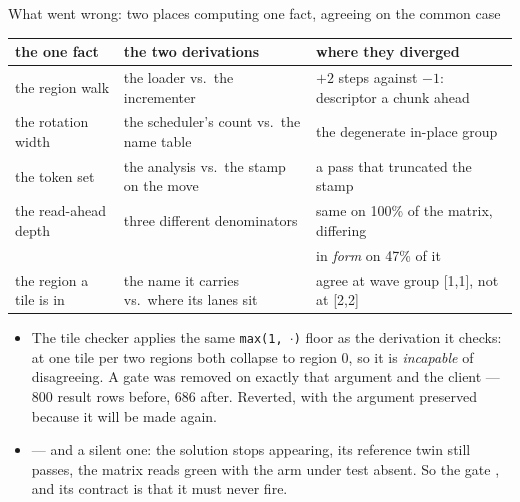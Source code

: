\begin{frame}{What went wrong: two places computing one fact, agreeing on the common case}
\begin{center}
{\scriptsize\setlength{\tabcolsep}{4pt}
\begin{tabular}{lll}
\toprule
\textbf{the one fact} & \textbf{the two derivations} & \textbf{where they diverged} \\
\midrule
the region walk & the loader vs.\ the incrementer & $+2$ steps against $-1$: descriptor a chunk ahead \\
the rotation width & the scheduler's count vs.\ the name table & the degenerate in-place group \\
the token set & the analysis vs.\ the stamp on the move & a pass that truncated the stamp \\
the read-ahead depth & three different denominators & same on 100\% of the matrix, differing \\
 & & in \emph{form} on 47\% of it \\
the region a tile is in & the name it carries vs.\ where its lanes sit & agree at wave group [1,1], not at [2,2] \\
\bottomrule
\end{tabular}}
\end{center}
\vspace{1mm}
\begin{itemize}
\item {} The tile checker applies the same \texttt{max(1,\,$\cdot$)} floor as the
      derivation it checks: at one tile per two regions both collapse to region 0, so it is
      \emph{incapable} of disagreeing. A gate was removed on exactly that argument and the client
       --- 800 result rows before, 686 after. Reverted, with the argument preserved
      because it will be made again.
\item {} --- and a silent one: the solution stops appearing, its reference twin still passes,
      the matrix reads green with the arm under test absent. So the gate , and its
      contract is that it must never fire.
\end{itemize}
\end{frame}
